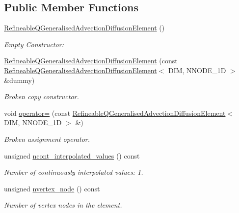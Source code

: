 \subsection*{Public Member Functions}
\begin{DoxyCompactItemize}
\item 
\hyperlink{classoomph_1_1RefineableQGeneralisedAdvectionDiffusionElement_aba8e7d52a832cefdbc121ddcb21e0856}{Refineable\+Q\+Generalised\+Advection\+Diffusion\+Element} ()
\begin{DoxyCompactList}\small\item\em Empty Constructor\+: \end{DoxyCompactList}\item 
\hyperlink{classoomph_1_1RefineableQGeneralisedAdvectionDiffusionElement_a19c7bc58ef5c41d6416d3e903938ac39}{Refineable\+Q\+Generalised\+Advection\+Diffusion\+Element} (const \hyperlink{classoomph_1_1RefineableQGeneralisedAdvectionDiffusionElement}{Refineable\+Q\+Generalised\+Advection\+Diffusion\+Element}$<$ D\+IM, N\+N\+O\+D\+E\+\_\+1D $>$ \&dummy)
\begin{DoxyCompactList}\small\item\em Broken copy constructor. \end{DoxyCompactList}\item 
void \hyperlink{classoomph_1_1RefineableQGeneralisedAdvectionDiffusionElement_ad37e57aa0043c330dafb17f2c02035bb}{operator=} (const \hyperlink{classoomph_1_1RefineableQGeneralisedAdvectionDiffusionElement}{Refineable\+Q\+Generalised\+Advection\+Diffusion\+Element}$<$ D\+IM, N\+N\+O\+D\+E\+\_\+1D $>$ \&)
\begin{DoxyCompactList}\small\item\em Broken assignment operator. \end{DoxyCompactList}\item 
unsigned \hyperlink{classoomph_1_1RefineableQGeneralisedAdvectionDiffusionElement_abacb5de2a6ef39956ba82c8519bfc9c6}{ncont\+\_\+interpolated\+\_\+values} () const
\begin{DoxyCompactList}\small\item\em Number of continuously interpolated values\+: 1. \end{DoxyCompactList}\item 
unsigned \hyperlink{classoomph_1_1RefineableQGeneralisedAdvectionDiffusionElement_a7bbed92069c97890985f84fd996f32a4}{nvertex\+\_\+node} () const
\begin{DoxyCompactList}\small\item\em Number of vertex nodes in the element. \end{DoxyCompactList}\item 

\end{DoxyCompactItemize}
